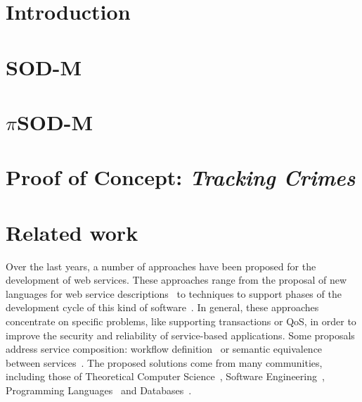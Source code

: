 \documentclass{llncs}
\theoremstyle{plain}
\theoremstyle{plain}
\theoremstyle{plain}
\begin{document}

\section{Introduction}
\label{sec:intro}



\section{SOD-M}\label{sec:sodm}



\section{$\pi$SOD-M}\label{sec:pisodm}



\section{Proof of Concept: \textit{Tracking Crimes}}\label{sec:poc}



\section{Related work}
\label{sec:related}
Over the last years, a number of approaches have been proposed for the
development of web services. These approaches range from the proposal of new 
languages for web service descriptions~\cite{bpel03,SBS04} 
to techniques to support phases of the development cycle of this kind of
software~\cite{lipari2007}. In general, these
approaches concentrate on specific problems, like supporting transactions or
QoS, in order to improve the security and reliability of service-based
applications. Some proposals address service composition: workflow
definition~\cite{AalstHKB03,MuP06} or semantic equivalence between
services~\cite{BHM06}. The proposed solutions come from many communities, 
including those of Theoretical Computer Science~\cite{VA05,GGP08}, 
Software Engineering~\cite{Aal03,MendesPDB09}, Programming
Languages~\cite{MPC08,bpel03} and Databases~\cite{ABM01}.
\end{document}

